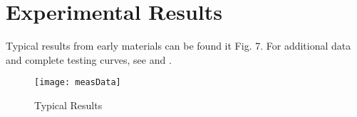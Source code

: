 \section{Experimental Results}
Typical results from early materials can be found it Fig. 7. For additional data and complete testing curves, see \cite{sThesis} and \cite{mThesis}.

\begin{figure}[here]
\centering
\texttt{[image: measData]}
\caption{Typical Results}
\label{fig:measData}
\end{figure}

